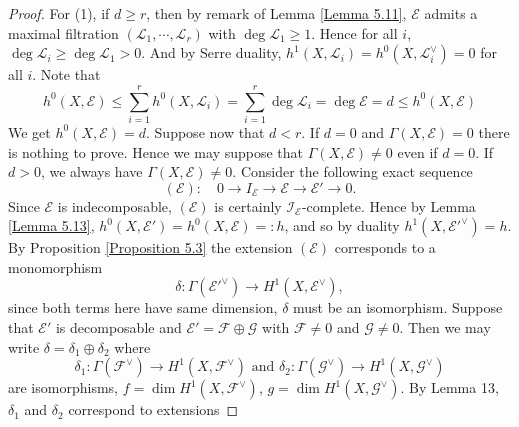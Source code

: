 \documentclass{ctexart}
\begin{document}
\begin{proof}
    For (1), if $d \ge r$, then by remark of Lemma \ref{Lemma 5.11}, 
    $\mathcal{E}$ admits a maximal filtration $(\mathcal{L}_{1}, \cdots, \mathcal{L}_{r})$ with $\deg \mathcal{L}_{1} \ge 1$.
    Hence for all $i$, $\deg \mathcal{L}_{i} \ge \deg \mathcal{L}_{1} > 0$.
    And by Serre duality, $h^{1}(X, \mathcal{L}_{i}) = h^{0}(X, \mathcal{L}_{i}^{\vee}) = 0$ for all $i$.
    Note that
    \begin{equation}
        h^{0}(X, \mathcal{E}) \le \sum_{i = 1}^{r} h^{0}(X, \mathcal{L}_{i}) = \sum_{i = 1}^{r} \deg \mathcal{L}_{i} = \deg \mathcal{E} = d \le h^{0}(X, \mathcal{E})
    \end{equation}
    We get $h^{0}(X, \mathcal{E}) = d$.
    Suppose now that $d < r$. If $d = 0$ and $\Gamma(X, \mathcal{E}) = 0$ there is nothing to prove.
    Hence we may suppose that $\Gamma(X, \mathcal{E}) \neq 0$ even if $d = 0$. 
    If $d > 0$, we always have $\Gamma(X, \mathcal{E}) \neq 0$. 
    Consider the following exact sequence
    \begin{equation}
        (\mathcal{E}): \quad 0 \longrightarrow I_{\mathcal{E}} \longrightarrow \mathcal{E} \longrightarrow \mathcal{E}' \longrightarrow 0.
    \end{equation}
    Since $\mathcal{E}$ is indecomposable, $(\mathcal{E})$ is certainly $\mathcal{I}_{\mathcal{E}}$-complete.
    Hence by Lemma \ref{Lemma 5.13}, $h^{0}(X, \mathcal{E}') = h^{0}(X, \mathcal{E}) =: h$,
    and so by duality $h^{1}(X, \mathcal{E}'^{\vee}) = h$.
    By Proposition \ref{Proposition 5.3} the extension $(\mathcal{E})$ corresponds to a monomorphism
    \begin{equation}
        \delta: \Gamma(\mathcal{E}'^{\vee}) \longrightarrow H^{1}(X, \mathcal{E}^{\vee}),
    \end{equation}
    since both terms here have same dimension, $\delta$ must be an isomorphism.
    Suppose that $\mathcal{E}'$ is decomposable and $\mathcal{E}' = \mathcal{F} \oplus \mathcal{G}$ with $\mathcal{F} \neq 0$ and $\mathcal{G} \neq 0$.
    Then we may write $\delta = \delta_{1} \oplus \delta_{2}$ where
    \begin{equation}
        \delta_{1}: \Gamma(\mathcal{F}^{\vee}) \longrightarrow H^{1}(X, \mathcal{F}^{\vee}) \text{ and } \delta_{2}: \Gamma(\mathcal{G}^{\vee}) \longrightarrow H^{1}(X, \mathcal{G}^{\vee})
    \end{equation}
    are isomorphisms, $f = \dim H^{1}(X, \mathcal{F}^{\vee})$, $g = \dim H^{1}(X, \mathcal{G}^{\vee})$. By Lemma 13, $\delta_{1}$ and $\delta_{2}$ correspond to extensions

\end{proof}
\end{document}
